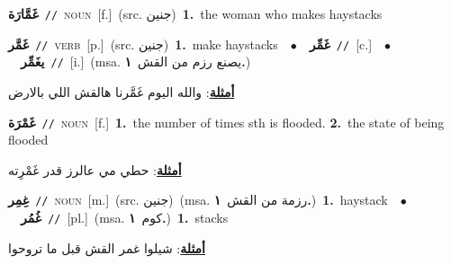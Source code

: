 \documentclass[10pt,a4paper,twoside]{article} %
\begin{document}
\begin{multicols}{2}
{\setlength\topsep{0pt}\textbf{\foreignlanguage{arabic}{غَمَّارَة}}\ {\color{gray}\texttt{//}\color{black}}\ \textsc{noun}\ [f.]\ (src. \color{gray}\foreignlanguage{arabic}{جنين}\color{black})\ \textbf{1.}~the woman who makes haystacks\ } \vspace{2mm}

{\setlength\topsep{0pt}\textbf{\foreignlanguage{arabic}{غَمَّر}}\ {\color{gray}\texttt{//}\color{black}}\ \textsc{verb}\ [p.]\ (src. \color{gray}\foreignlanguage{arabic}{جنين}\color{black})\ \textbf{1.}~make haystacks\ \ $\bullet$\ \ \setlength\topsep{0pt}\textbf{\foreignlanguage{arabic}{غَمِّر}}\ {\color{gray}\texttt{//}\color{black}}\ [c.]\ \ $\bullet$\ \ \setlength\topsep{0pt}\textbf{\foreignlanguage{arabic}{يغَمِّر}}\ {\color{gray}\texttt{//}\color{black}}\ [i.]\ \color{gray}(msa. \foreignlanguage{arabic}{يصنع رزم من القش}~\foreignlanguage{arabic}{\textbf{١.}})\color{black}\  \begin{flushright}\color{gray}\foreignlanguage{arabic}{\textbf{\underline{\foreignlanguage{arabic}{أمثلة}}}: والله اليوم غَمَّرنا هالقش اللي بالارض}\end{flushright}\color{black}} \vspace{2mm}

{\setlength\topsep{0pt}\textbf{\foreignlanguage{arabic}{غَمْرَة}}\ {\color{gray}\texttt{//}\color{black}}\ \textsc{noun}\ [f.]\ \textbf{1.}~the number of times sth is flooded.  \textbf{2.}~the state of being flooded\  \begin{flushright}\color{gray}\foreignlanguage{arabic}{\textbf{\underline{\foreignlanguage{arabic}{أمثلة}}}: حطي مي عالرز قدر غَمْرِته}\end{flushright}\color{black}} \vspace{2mm}

{\setlength\topsep{0pt}\textbf{\foreignlanguage{arabic}{غِمِر}}\ {\color{gray}\texttt{//}\color{black}}\ \textsc{noun}\ [m.]\ (src. \color{gray}\foreignlanguage{arabic}{جنين}\color{black})\ \color{gray}(msa. \foreignlanguage{arabic}{رزمة من القش}~\foreignlanguage{arabic}{\textbf{١.}})\color{black}\ \textbf{1.}~haystack\ \ $\bullet$\ \ \setlength\topsep{0pt}\textbf{\foreignlanguage{arabic}{غُمُر}}\ {\color{gray}\texttt{//}\color{black}}\ [pl.]\ \color{gray}(msa. \foreignlanguage{arabic}{كوم}~\foreignlanguage{arabic}{\textbf{١.}})\color{black}\ \textbf{1.}~stacks\  \begin{flushright}\color{gray}\foreignlanguage{arabic}{\textbf{\underline{\foreignlanguage{arabic}{أمثلة}}}: شيلوا غمر القش قبل ما تروحوا}\end{flushright}\color{black}} \vspace{2mm}


\end{multicols}
\end{document}
